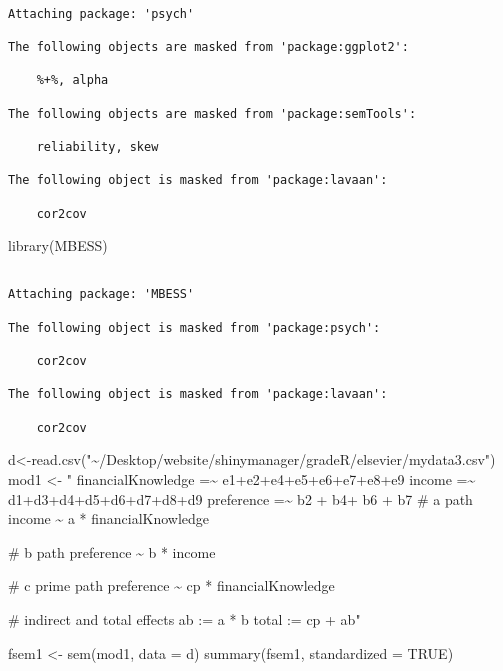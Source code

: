 \documentclass[
  super,
  preprint,
  3p]{elsarticle}
\newenvironment{Shaded}{\begin{snugshade}}{\end{snugshade}}
\newcommand{\AttributeTok}[1]{\textcolor[rgb]{0.40,0.45,0.13}{#1}}
\newcommand{\ConstantTok}[1]{\textcolor[rgb]{0.56,0.35,0.01}{#1}}
\newcommand{\FunctionTok}[1]{\textcolor[rgb]{0.28,0.35,0.67}{#1}}
\newcommand{\NormalTok}[1]{\textcolor[rgb]{0.00,0.23,0.31}{#1}}
\newcommand{\OtherTok}[1]{\textcolor[rgb]{0.00,0.23,0.31}{#1}}
\newcommand{\StringTok}[1]{\textcolor[rgb]{0.13,0.47,0.30}{#1}}
\begin{document}
\begin{verbatim}

Attaching package: 'psych'

The following objects are masked from 'package:ggplot2':

    %+%, alpha

The following objects are masked from 'package:semTools':

    reliability, skew

The following object is masked from 'package:lavaan':

    cor2cov
\end{verbatim}

\begin{Shaded}
\begin{Highlighting}[]
\FunctionTok{library}\NormalTok{(MBESS)}
\end{Highlighting}
\end{Shaded}

\begin{verbatim}

Attaching package: 'MBESS'

The following object is masked from 'package:psych':

    cor2cov

The following object is masked from 'package:lavaan':

    cor2cov
\end{verbatim}

\begin{Shaded}
\begin{Highlighting}[]
\NormalTok{d}\OtherTok{\textless{}{-}}\FunctionTok{read.csv}\NormalTok{(}\StringTok{"\textasciitilde{}/Desktop/website/shinymanager/gradeR/elsevier/mydata3.csv"}\NormalTok{)}
\NormalTok{mod1 }\OtherTok{\textless{}{-}} \StringTok{"}
\StringTok{      financialKnowledge =\textasciitilde{} e1+e2+e4+e5+e6+e7+e8+e9}
\StringTok{      income =\textasciitilde{} d1+d3+d4+d5+d6+d7+d8+d9}
\StringTok{      preference =\textasciitilde{} b2 + b4+ b6 + b7}
\StringTok{      }
\StringTok{        \# a path}
\StringTok{         income \textasciitilde{} a * financialKnowledge}

\StringTok{         \# b path}
\StringTok{         preference \textasciitilde{} b * income}

\StringTok{         \# c prime path }
\StringTok{         preference \textasciitilde{} cp * financialKnowledge}

\StringTok{         \# indirect and total effects}
\StringTok{         ab := a * b}
\StringTok{         total := cp + ab"}

\NormalTok{fsem1 }\OtherTok{\textless{}{-}} \FunctionTok{sem}\NormalTok{(mod1, }\AttributeTok{data =}\NormalTok{ d)}
\FunctionTok{summary}\NormalTok{(fsem1, }\AttributeTok{standardized =} \ConstantTok{TRUE}\NormalTok{)}
\end{Highlighting}
\end{Shaded}
\end{document}
